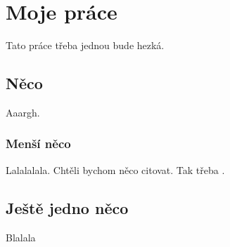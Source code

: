 \chapter{Moje práce}
Tato práce třeba jednou bude hezká.

\section{Něco}
Aaargh.
\subsection{Menší něco}
Lalalalala. Chtěli bychom něco citovat. Tak třeba \cite{baker}.
\section{Ještě jedno něco}
Blalala
